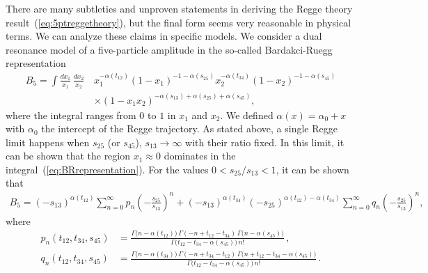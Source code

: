 There are many subtleties and unproven statements in deriving the Regge theory result~(\ref{eq:5ptreggetheory}), but the final form seems very reasonable in physical terms.
We can analyze these claims in   specific models.
We consider a dual resonance model of a five-particle amplitude in the so-called Bardakci-Ruegg representation~\cite{Bardakci:1969ue}
\begin{align}
  B_5 =  \int \frac{dx_1}{x_1}\, \frac{dx_2}{x_2}\, &
  x_1^{-\alpha(t_{12})} \left( 1-x_1 \right)^{-1-\alpha\left( s_{25} \right)}
  x_2^{-\alpha(t_{34})} \left( 1-x_2 \right)^{-1-\alpha\left( s_{45} \right)}
  \nonumber                                                                                                                                                                        \\
                                                    & \times \left( 1-x_1 x_2 \right)^{-\alpha\left( s_{13} \right) + \alpha\left( s_{25} \right) + \alpha\left( s_{45} \right) },
  \label{eq:BRrepresentation}
\end{align}
where the  integral ranges from $0$ to $1$ in $x_1$ and $x_2$. We defined   $\alpha(x)  = \alpha_0 + x$ with  $\alpha_0$  the intercept of the Regge trajectory.
As stated above, a single Regge limit happens when $ s_{25}$ (or  $s_{45}$),  $s_{13} \rightarrow \infty $ with their ratio fixed. In this limit, it can be shown  \cite{Brower:1974yv} that the region $ x_1 \approx 0 $ dominates in the integral~(\ref{eq:BRrepresentation}).
For the values $ 0<s_{25}/s_{13}<1 $, it can be shown that
\begin{align}
  B_5 =
  \left(
  -s_{13}
  \right)^{\alpha(t_{12})}
  \sum_{n=0}^{\infty} p_n \left( -\frac{s_{25}}{s_{13}} \right)^{n}
  +
  \left(
  -s_{13}
  \right)^{\alpha(t_{34})}
  \left(
  -s_{25}
  \right)^{\alpha(t_{12})-\alpha(t_{34})}
  \sum_{n=0}^{\infty} q_n \left( -\frac{s_{25}}{s_{13}} \right)^{n}
  ,\label{eq:singleReggeBR}
\end{align}
where
\begin{align}
  p_n (t_{12},t_{34}, s_{45}) & =
  \frac{\Gamma\big( n - \alpha(t_{12})\big)\, \Gamma( -n+t_{12}-t_{34})\, \Gamma\big( n - \alpha( s_{45} ) \big)}{\Gamma\big( t_{12}-t_{34}-\alpha( s_{45} ) \big) \, n!}\,,
  \\
  q_n (t_{12},t_{34}, s_{45}) & =
  \frac{\Gamma\big( n - \alpha(t_{34}) \big) \,\Gamma( -n+t_{34}-t_{12})\, \Gamma\big( n +t_{12}-t_{34}- \alpha( s_{45}) \big)}{\Gamma\big( t_{12}-t_{34}-\alpha( s_{45} ) \big) \, n!}\,.
  \label{eq:pqExpressions}
\end{align}
